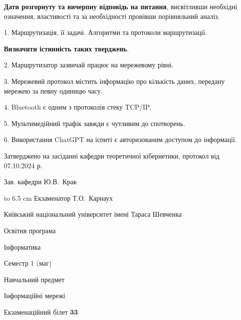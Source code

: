 \documentclass[12pt, ukrainian]{article}
\begin{document}
{
\qquad\textbf{Дати розгорнуту та вичерпну відповідь на питання}, висвітливши необхідні означення, властивості та за необхідності провівши порівняльний аналіз.

1. Маршрутизація, її задачі. Алгоритми та протоколи маршрутизації.



\qquad\textbf{Визначити істинність таких тверджень}.

2. Маршрутизатор зазвичай працює на мережевому рівні.


3. Мережевий протокол містить інформацію про кількість даних, передану мережею за певну одиницю часу.


4. Bluetooth є одним з протоколів стеку TCP/IP.


5. Мультимедійний трафік завжди є чутливим до спотворень.


6. Використання ChatGPT на іспиті є авторизованим доступом до інформації.

}
{\smallskip\smallskip \begin {scriptsize} Затверджено на засіданні кафедри теоретичної кібернетики, протокол   від   07.10.2024 р.\par\smallskip\smallskip\smallskip\smallskip
{\parbox {6.5 cm} {Зав. кафедри \dotfill Ю.В.~Крак}}\hspace {0.7cm} {\hbox to 6.5 cm { Екзаменатор \dotfill Т.О.~Карнаух}} \end{scriptsize}}
\vspace{0.9cm}
{{\begin {scriptsize}\par
{ \center  Київський національний університет імені Тараса Шевченка \par}
{\parbox {5 cm}{Освітня програма \hfill}{\parbox {7 cm}{Інформатика\hfill}}\parbox {6 cm}{\hfill Семестр 1 (маг)}}\par
{\parbox {5 cm} {Навчальний предмет \hfill}\parbox {7 cm}{Інформаційні мережі \hfill}\parbox {6cm}{\hfill}\par}\vspace{-15pt} \end{scriptsize}}{\center Екзаменаційний білет \No \textbf { 33 }\par}}
\end{document}
